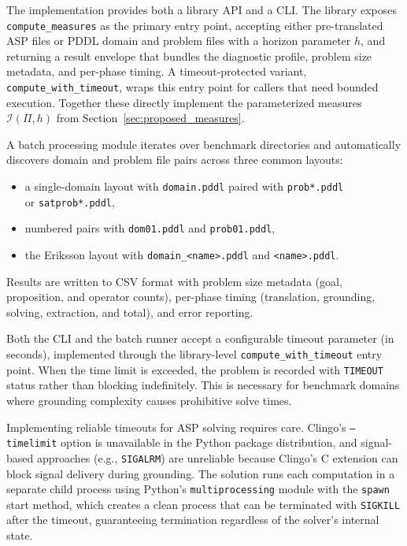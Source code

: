 The implementation provides both a library \ac{API} and a \ac{CLI}. The library exposes \texttt{compute\_measures} as the primary entry point, accepting either pre-translated \ac{ASP} files or \ac{PDDL} domain and problem files with a horizon parameter $h$, and returning a result envelope that bundles the diagnostic profile, problem size metadata, and per-phase timing. A timeout-protected variant, \texttt{compute\_with\_timeout}, wraps this entry point for callers that need bounded execution. Together these directly implement the parameterized measures $\mathcal{I}(\Pi, h)$ from Section~\ref{sec:proposed_measures}.

A batch processing module iterates over benchmark directories and automatically discovers domain and problem file pairs across three common layouts:
\begin{itemize}
    \item a single-domain layout with \texttt{domain.pddl} paired with \texttt{prob*.pddl} \\
          or \texttt{satprob*.pddl},
    \item numbered pairs with \texttt{dom01.pddl} and \texttt{prob01.pddl},
    \item the Eriksson layout with \texttt{domain\_<name>.pddl} and \texttt{<name>.pddl}.
\end{itemize}
Results are written to CSV format with problem size metadata (goal, proposition, and operator counts), per-phase timing (translation, grounding, solving, extraction, and total), and error reporting.

Both the \ac{CLI} and the batch runner accept a configurable timeout parameter (in seconds), implemented through the library-level \texttt{compute\_with\_timeout} entry point. When the time limit is exceeded, the problem is recorded with \texttt{TIMEOUT} status rather than blocking indefinitely. This is necessary for benchmark domains where grounding complexity causes prohibitive solve times.

Implementing reliable timeouts for \ac{ASP} solving requires care. Clingo's \texttt{--time\-limit} option is unavailable in the Python package distribution, and signal-based approaches (e.g., \texttt{SIGALRM}) are unreliable because Clingo's C extension can block signal delivery during grounding. The solution runs each computation in a separate child process using Python's \texttt{multiprocessing} module with the \texttt{spawn} start method, which creates a clean process that can be terminated with \texttt{SIGKILL} after the timeout, guaranteeing termination regardless of the solver's internal state.

